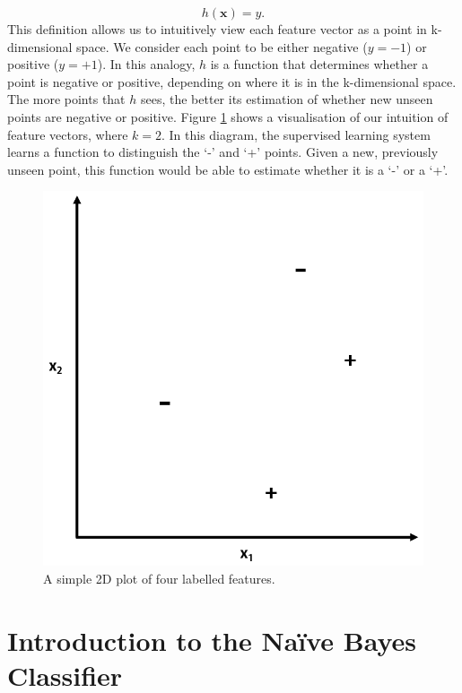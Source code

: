 \documentclass[12pt,a4paper,twoside,openright]{report}
\begin{document}
\begin{equation}
	h(\mathbf{x}) = y.
\end{equation}
This definition allows us to intuitively view each feature vector as a point in k-dimensional space. We consider each point to be either negative ($y = -1$) or positive ($y = +1$). In this analogy, $h$ is a function that determines whether a point is negative or positive, depending on where it is in the k-dimensional space. The more points that $h$ sees, the better its estimation of whether new unseen points are negative or positive.
\newline
\newline
Figure \ref{fig:2dpoints} shows a visualisation of our intuition of feature vectors, where $k = 2$. In this diagram, the supervised learning system learns a function to distinguish the `-' and `+' points. Given a new, previously unseen point, this function would be able to estimate whether it is a `-' or a `+'.
\begin{figure}
	\begin{center}
		\includegraphics[scale=0.6]{figs/2dpoints.png}
	\end{center}
	\caption{A simple 2D plot of four labelled features.}
	\label{fig:2dpoints}
\end{figure}
\section{Introduction to the Na\"{i}ve Bayes Classifier} \label{prep-bayes}
\end{document}
